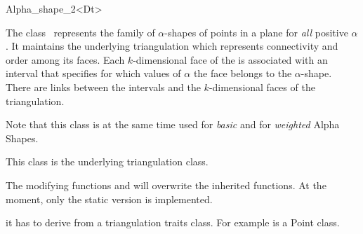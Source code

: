 \begin{ccRefClass} {Alpha_shape_2<Dt>}

\ccDefinition

The class \ccClassTemplateName\ represents the family of
$\alpha$-shapes of points in a plane for {\em all} positive
$\alpha$. It maintains the underlying triangulation  which
represents connectivity and order among its faces. Each
$k$-dimensional face of the  is associated with
an interval that specifies for which values of $\alpha$ the face
belongs to the $\alpha$-shape. There are links between the intervals
and the $k$-dimensional faces of the triangulation.

Note that this class is at the same time used for {\em basic} and
for {\em weighted} Alpha Shapes.

\ccInheritsFrom


This class is the underlying triangulation class.

The modifying functions  and  will overwrite
the inherited functions. At the moment, only the static version is implemented.

\ccTypes
{}
\ccThreeToTwo

it has to derive from a  triangulation traits class.  
For example  is a Point class. 






\end{ccRefClass}
